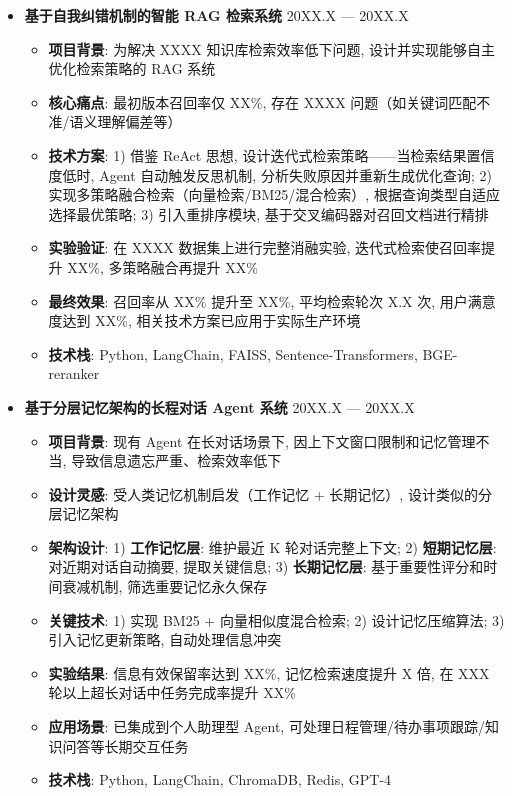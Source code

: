 \documentclass[zh]{resume}
\begin{document}
\begin{itemize}
    \item \textbf{基于自我纠错机制的智能 RAG 检索系统} \hfill 20XX.X --- 20XX.X
    \begin{itemize}
        \item \textbf{项目背景}: 为解决 XXXX 知识库检索效率低下问题, 设计并实现能够自主优化检索策略的 RAG 系统
        \item \textbf{核心痛点}: 最初版本召回率仅 XX\%, 存在 XXXX 问题（如关键词匹配不准/语义理解偏差等）
        \item \textbf{技术方案}: 1) 借鉴 ReAct 思想, 设计迭代式检索策略——当检索结果置信度低时, Agent 自动触发反思机制, 分析失败原因并重新生成优化查询; 2) 实现多策略融合检索（向量检索/BM25/混合检索）, 根据查询类型自适应选择最优策略; 3) 引入重排序模块, 基于交叉编码器对召回文档进行精排
        \item \textbf{实验验证}: 在 XXXX 数据集上进行完整消融实验, 迭代式检索使召回率提升 XX\%, 多策略融合再提升 XX\%
        \item \textbf{最终效果}: 召回率从 XX\% 提升至 XX\%, 平均检索轮次 X.X 次, 用户满意度达到 XX\%, 相关技术方案已应用于实际生产环境
        \item \textbf{技术栈}: Python, LangChain, FAISS, Sentence-Transformers, BGE-reranker
    \end{itemize}

    \item \textbf{基于分层记忆架构的长程对话 Agent 系统} \hfill 20XX.X --- 20XX.X
    \begin{itemize}
        \item \textbf{项目背景}: 现有 Agent 在长对话场景下, 因上下文窗口限制和记忆管理不当, 导致信息遗忘严重、检索效率低下
        \item \textbf{设计灵感}: 受人类记忆机制启发（工作记忆 + 长期记忆）, 设计类似的分层记忆架构
        \item \textbf{架构设计}: 1) \textbf{工作记忆层}: 维护最近 K 轮对话完整上下文; 2) \textbf{短期记忆层}: 对近期对话自动摘要, 提取关键信息; 3) \textbf{长期记忆层}: 基于重要性评分和时间衰减机制, 筛选重要记忆永久保存
        \item \textbf{关键技术}: 1) 实现 BM25 + 向量相似度混合检索; 2) 设计记忆压缩算法; 3) 引入记忆更新策略, 自动处理信息冲突
        \item \textbf{实验结果}: 信息有效保留率达到 XX\%, 记忆检索速度提升 X 倍, 在 XXX 轮以上超长对话中任务完成率提升 XX\%
        \item \textbf{应用场景}: 已集成到个人助理型 Agent, 可处理日程管理/待办事项跟踪/知识问答等长期交互任务
        \item \textbf{技术栈}: Python, LangChain, ChromaDB, Redis, GPT-4
    \end{itemize}
\end{itemize}
\end{document}
